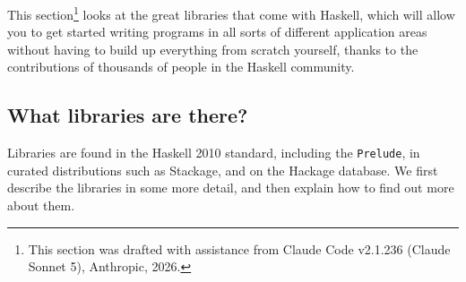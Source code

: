 This section\footnote{This section was drafted with assistance from Claude Code v2.1.236 (Claude Sonnet 5), Anthropic, 2026.} looks at the great libraries that come with Haskell, which will allow you to get started writing programs in all sorts of different application areas without having to build up everything from scratch yourself, thanks to the contributions of thousands of people in the Haskell community.

\subsection*{What libraries are there?}

Libraries are found in the Haskell 2010 standard, including the \texttt{Prelude}, in curated distributions such as Stackage, and on the Hackage database.
We first describe the libraries in some more detail, and then explain how to find out more about them.


